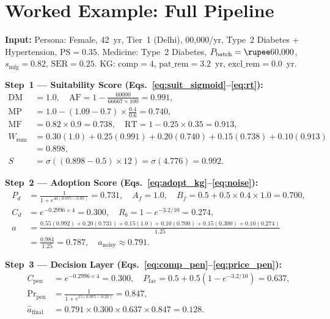 \documentclass[10pt,journal,compsoc]{IEEEtran}
\newcommand{\sigmoid}{\sigma}
\begin{document}
\appendix
\section{Worked Example: Full Pipeline}
\label{app:worked_example}

\textbf{Input:}
Persona: Female, 42~yr, Tier~1 (Delhi), 00{,}000/yr,
Type~2 Diabetes + Hypertension, $\text{PS}=0.35$.
Medicine: Type~2 Diabetes, $P_{\text{batch}}=\text{\rupee}60{,}000$,
$s_{\text{mfg}}=0.82$, $\text{SER}=0.25$.
KG: $\text{comp}=4$, $\text{pat\_rem}=3.2$~yr, $\text{excl\_rem}=0.0$~yr.

\textbf{Step~1 --- Suitability Score (Eqs.~\ref{eq:suit_sigmoid}--\ref{eq:rt}):}
\begin{align*}
  \text{DM} &= 1.0,\quad
  \text{AF} = 1-\tfrac{60000}{66667\times100} = 0.991,\\
  \text{MP} &= 1.0-(1.09-0.7)\times\tfrac{0.4}{0.6} = 0.740,\\
  \text{MF} &= 0.82\times0.9 = 0.738,\quad
  \text{RT} = 1-0.25\times0.35 = 0.913,\\
  W_{\text{sum}} &= 0.30(1.0)+0.25(0.991)+0.20(0.740)+0.15(0.738)+0.10(0.913)\\
                 &= 0.898,\\
  S &= \sigmoid((0.898-0.5)\times12) = \sigmoid(4.776) = 0.992.
\end{align*}

\textbf{Step~2 --- Adoption Score (Eqs.~\ref{eq:adopt_kg}--\ref{eq:noise}):}
\begin{align*}
  P_d &= \tfrac{1}{1+e^{40(0.075-0.05)}} = 0.731,\quad
  A_f = 1.0,\quad
  B_f = 0.5+0.5\times0.4\times1.0 = 0.700,\\
  C_d &= e^{-0.2996\times4} = 0.300,\quad
  R_b = 1-e^{-3.2/10} = 0.274,\\
  a &= \tfrac{0.55(0.992)+0.20(0.731)+0.15(1.0)+0.10(0.700)
              +0.15(0.300)+0.10(0.274)}{1.25}\\
    &= \tfrac{0.984}{1.25} = 0.787,\quad
  a_{\text{noisy}} \approx 0.791.
\end{align*}

\textbf{Step~3 --- Decision Layer (Eqs.~\ref{eq:comp_pen}--\ref{eq:price_pen}):}
\begin{align*}
  C_{\text{pen}} &= e^{-0.2996\times4} = 0.300,\quad
  P_{\text{fac}} = 0.5+0.5(1-e^{-3.2/10}) = 0.637,\\
  \text{Pr}_{\text{pen}} &= \tfrac{1}{1+e^{15(0.075-0.20)}} = 0.847,\\
  \hat{a}_{\text{final}} &= 0.791\times0.300\times0.637\times0.847 = 0.128.
\end{align*}
\end{document}
